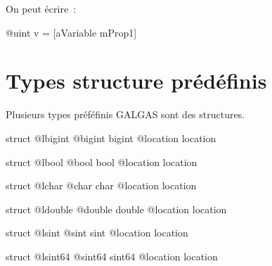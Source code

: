 On peut écrire~:
\begin{galgas}
@uint v = [aVariable mProp1]
\end{galgas}



\section{Types structure prédéfinis}

Plusieurs types préféfinis GALGAS sont des structures.
 

\begin{galgas}
struct @lbigint {
  @bigint bigint
  @location location
}
\end{galgas}


 

\begin{galgas}
struct @lbool {
  @bool bool
  @location location
}
\end{galgas}




\begin{galgas}
struct @lchar {
  @char char
  @location location
}
\end{galgas}



\begin{galgas}
struct @ldouble {
  @double double
  @location location
}
\end{galgas}








\begin{galgas}
struct @lsint {
  @sint sint
  @location location
}
\end{galgas}









\begin{galgas}
struct @lsint64 {
  @sint64 sint64
  @location location
}
\end{galgas}







